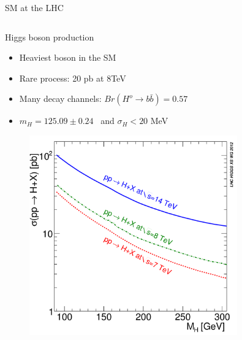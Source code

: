 \begin{frame}{SM at the LHC}
\begin{columns}
\begin{column}{.50\textwidth}
\begin{block}{Higgs boson production}
\begin{itemize}\tiny
\item Heaviest boson in the SM 
\item Rare process: 20 pb at 8TeV
\item Many decay channels: $Br(H^{o}\to b\bar{b})=0.57$
\item $m_{H}=125.09\pm 0.24$ \GeVcc~and $\sigma_{H}<20$ MeV
\end{itemize}
\end{block}

\vspace{-.2cm}
\begin{figure}[!Hhtbp]
  \begin{center}
    \includegraphics[width=0.8\textwidth]{../figs/totalXS_LM.png}
  \end{center}
\end{figure}

\end{column}
\end{columns}

\end{frame}

\fi